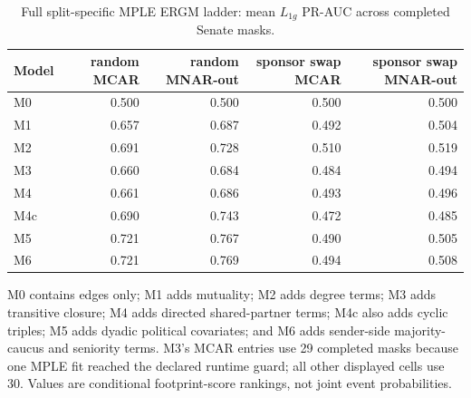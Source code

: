 \begin{table}[tbp]
\centering
\small
\caption{Full split-specific MPLE ERGM ladder: mean $L_{1g}$ PR-AUC across completed Senate masks.}
\label{tab:ergm-ladder}
\begin{tabular}{lrrrr}
\toprule
Model & random MCAR & random MNAR-out & sponsor swap MCAR & sponsor swap MNAR-out \\
\midrule
M0 & 0.500 & 0.500 & 0.500 & 0.500 \\
M1 & 0.657 & 0.687 & 0.492 & 0.504 \\
M2 & 0.691 & 0.728 & 0.510 & 0.519 \\
M3 & 0.660 & 0.684 & 0.484 & 0.494 \\
M4 & 0.661 & 0.686 & 0.493 & 0.496 \\
M4c & 0.690 & 0.743 & 0.472 & 0.485 \\
M5 & 0.721 & 0.767 & 0.490 & 0.505 \\
M6 & 0.721 & 0.769 & 0.494 & 0.508 \\
\bottomrule
\end{tabular}
\par\vspace{2pt}\footnotesize M0 contains edges only; M1 adds mutuality; M2 adds degree terms; M3 adds transitive closure; M4 adds directed shared-partner terms; M4c also adds cyclic triples; M5 adds dyadic political covariates; and M6 adds sender-side majority-caucus and seniority terms. M3's MCAR entries use 29 completed masks because one MPLE fit reached the declared runtime guard; all other displayed cells use 30. Values are conditional footprint-score rankings, not joint event probabilities.
\end{table}
